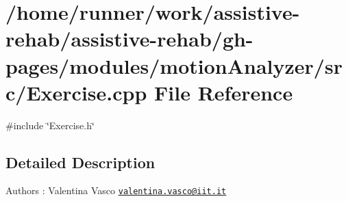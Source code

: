 \section{/home/runner/work/assistive-\/rehab/assistive-\/rehab/gh-\/pages/modules/motion\+Analyzer/src/\+Exercise.cpp File Reference}
\label{Exercise_8cpp}
{\ttfamily \#include \char`\"{}Exercise.\+h\char`\"{}}\newline


\subsection{Detailed Description}
\begin{DoxyAuthor}{Authors}
\+: Valentina Vasco \href{mailto:valentina.vasco@iit.it}{\tt valentina.\+vasco@iit.\+it} 
\end{DoxyAuthor}
